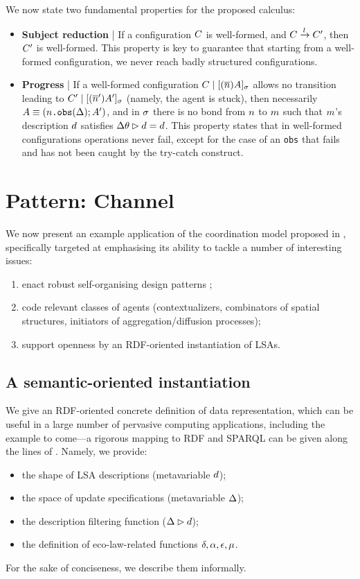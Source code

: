 \documentclass[12pt,a4paper,twoside,openright]{book}
\begin{document}
We now state two fundamental properties for the proposed calculus:
%
\begin{itemize}
 \item \textbf{Subject reduction} | If a configuration $C$ is well-formed, and $C\xrightarrow{l}C'$, then $C'$ is well-formed. This property is key to guarantee that starting from a well-formed configuration, we never reach badly structured configurations.

 \item \textbf{Progress} | If a well-formed configuration $C\;|\;[(\overline{n})A]_{\sigma}$ allows no transition leading to $C'\;|\;[(\overline{n}')A']_{\sigma}$ (namely, the agent is stuck), then necessarily $A\equiv(n\texttt{.obs}(\Delta);A')$, and in $\sigma$ there is no bond from $n$ to $m$ such that $m$'s description $d$ satisfies $\Delta\theta\rhd d=d$. This property states that in well-formed configurations operations never fail, except for the case of an \texttt{obs} that fails and has not been caught by the try-catch construct.
\end{itemize}

\chapter{Pattern: Channel}

We now present an example application of the coordination model proposed in , specifically targeted at emphasising its ability to tackle a number of interesting issues:
\begin{enumerate}
 \item enact robust self-organising design patterns \cite{FDMVA-NACO2012};
 \item code relevant classes of agents (contextualizers, combinators of spatial structures, initiators of aggregation/diffusion processes);
 \item support openness by an RDF-oriented instantiation of LSAs.
\end{enumerate}

\section{A semantic-oriented instantiation}

We give an RDF-oriented concrete definition of data representation, which can be useful in a large number of pervasive computing applications, including the example to come---a rigorous mapping to RDF and SPARQL can be given along the lines of \cite{SemanticSapereIGI2012}.
%
Namely, we provide:
\begin{itemize}
 \item the shape of LSA descriptions (metavariable $d$);
 \item the space of update specifications (metavariable $\Delta$);
 \item the description filtering function ($\Delta\rhd d$);
 \item the definition of eco-law-related functions $\delta,\alpha,\epsilon,\mu$.
\end{itemize}
For the sake of conciseness, we describe them informally.
\end{document}
